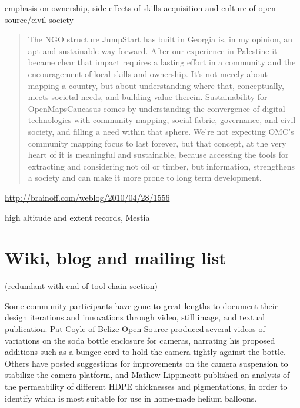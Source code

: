 \documentclass[11pt,oneside,notitlepage]{report}
\begin{document}
emphasis on ownership, side effects of skills acquisition and culture of open-source/civil society

\begin{quote}The NGO structure JumpStart has built in Georgia is, in my opinion, an apt and sustainable way forward. After our experience in Palestine it became clear that impact requires a lasting effort in a community and the encouragement of local skills and ownership. It’s not merely about mapping a country, but about understanding where that, conceptually, meets societal needs, and building value therein. Sustainability for OpenMapsCaucasus comes by understanding the convergence of digital technologies with community mapping, social fabric, governance, and civil society, and filling a need within that sphere. We’re not expecting OMC’s community mapping focus to last forever, but that concept, at the very heart of it is meaningful and sustainable, because accessing the tools for extracting and considering not oil or timber, but information, strengthens a society and can make it more prone to long term development.\end{quote} \url{http://brainoff.com/weblog/2010/04/28/1556}

high altitude and extent records, Mestia

\section{Wiki, blog and mailing list}

(redundant with end of tool chain section)

Some community participants have gone to great lengths to document their design iterations and innovations through video, still image, and textual publication. Pat Coyle of Belize Open Source produced several videos of variations on the soda bottle enclosure for cameras, narrating his proposed additions such as a bungee cord to hold the camera tightly against the bottle. Others have posted suggestions for improvements on the camera suspension to stabilize the camera platform, and Mathew Lippincott published an analysis of the permeability of different HDPE thicknesses and pigmentations, in order to identify which is most suitable for use in home-made helium balloons.

\end{document}
